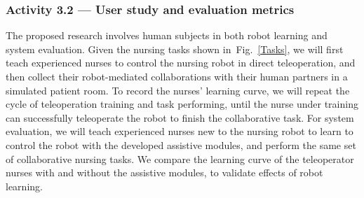 \documentclass[letterpaper, 11 pt, onecolumn]{article}
\newcommand{\fig}[1]{Fig.~\ref{#1}}
\begin{document}





 






\subsubsection{Activity 3.2 --- User study and evaluation metrics}\label{sec:plan-implementation-userstudy}
The proposed research involves human subjects in both robot learning and system evaluation. Given the nursing tasks shown in~\fig{Tasks}, we will first teach experienced nurses to control the nursing robot in direct teleoperation, and then collect their robot-mediated collaborations with their human partners in a simulated patient room. To record the nurses' learning curve, we will repeat the cycle of teleoperation training and task performing, until the nurse under training can successfully teleoperate the robot to finish the collaborative task. For system evaluation, we will teach experienced nurses new to the nursing robot to learn to control the robot with the developed assistive modules, and perform the same set of collaborative nursing tasks. We compare the learning curve of the teleoperator nurses with and without the assistive modules, to validate effects of robot learning.
\end{document}

